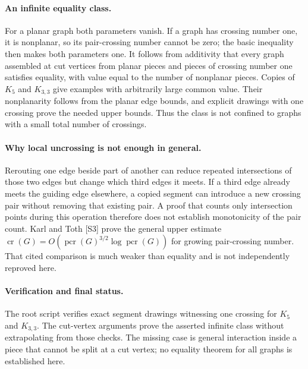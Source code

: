\documentclass[11pt,a4paper]{article}
\begin{document}
\paragraph{An infinite equality class.}
For a planar graph both parameters vanish. If a graph has
crossing number one, it is nonplanar, so its pair-crossing
number cannot be zero; the basic inequality then makes both
parameters one. It follows from additivity that every graph
assembled at cut vertices from planar pieces and pieces of
crossing number one satisfies equality, with value equal to
the number of nonplanar pieces. Copies of $K_5$ and $K_{3,3}$
give examples with arbitrarily large common value. Their
nonplanarity follows from the planar edge bounds, and explicit
drawings with one crossing prove the needed upper bounds.
Thus the class is not confined to graphs with a small total
number of crossings.

\paragraph{Why local uncrossing is not enough in general.}
Rerouting one edge beside part of another can reduce repeated
intersections of those two edges but change which third edges
it meets. If a third edge already meets the guiding edge
elsewhere, a copied segment can introduce a new crossing pair
without removing that existing pair. A proof that counts
only intersection points during this operation therefore
does not establish monotonicity of the pair count.
Karl and Toth [S3] prove the general upper estimate
$\operatorname{cr}(G)=O(\operatorname{pcr}(G)^{3/2}
\log\operatorname{pcr}(G))$ for growing pair-crossing number.
That cited comparison is much weaker than equality and is
not independently reproved here.

\paragraph{Verification and final status.}
The root script verifies exact segment drawings witnessing
one crossing for $K_5$ and $K_{3,3}$. The cut-vertex arguments
prove the asserted infinite class without extrapolating
from those checks. The missing case is general interaction
inside a piece that cannot be split at a cut vertex;
no equality theorem for all graphs is established here.
\end{document}

